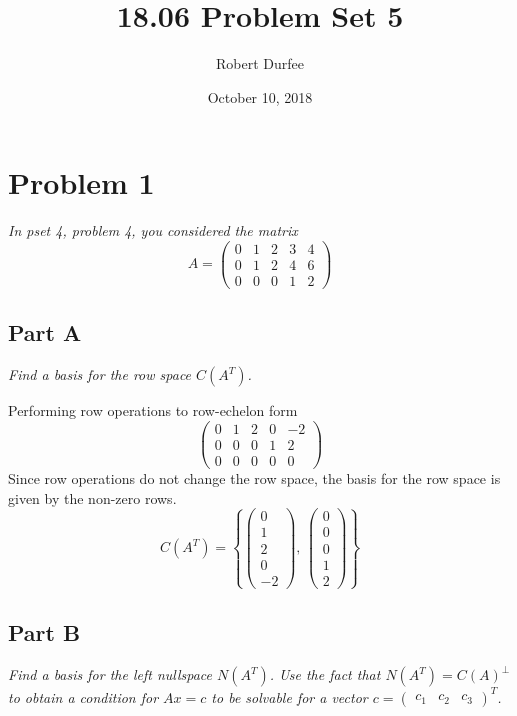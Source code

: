 \documentclass{article}
\title{18.06 Problem Set 5}
\author{Robert Durfee}
\date{October 10, 2018}
\begin{document}
\maketitle

\section*{Problem 1}

\textit{In pset 4, problem 4, you considered the matrix}
$$ A = \begin{pmatrix}
    0 & 1 & 2 & 3 & 4 \\
    0 & 1 & 2 & 4 & 6 \\
    0 & 0 & 0 & 1 & 2
\end{pmatrix} $$

\subsection*{Part A}

\textit{Find a basis for the row space $C(A^T)$.}

\bigbreak

Performing row operations to row-echelon form
$$ \begin{pmatrix}
    0 & 1 & 2 & 0 & -2 \\
    0 & 0 & 0 & 1 & 2 \\
    0 & 0 & 0 & 0 & 0
\end{pmatrix} $$
Since row operations do not change the row space, the basis for the row space
is given by the non-zero rows.
$$ C(A^T) = \left\{ \begin{pmatrix}
    0 \\
    1 \\
    2 \\
    0 \\
    -2
\end{pmatrix},\, \begin{pmatrix}
    0 \\
    0 \\
    0 \\
    1 \\
    2
\end{pmatrix} \right\} $$

\subsection*{Part B}

\textit{Find a basis for the left nullspace $N(A^T)$. Use the fact that
$N(A^T) = C(A)^\perp$ to obtain a condition for $Ax=c$ to be solvable for a
vector $c = \begin{pmatrix} c_1 & c_2 & c_3 \end{pmatrix}^T$.}
\end{document}
